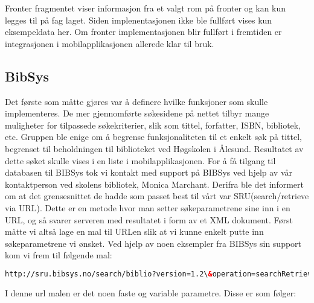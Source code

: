 \documentclass[../main.tex]{subfiles}
\begin{document}
Fronter fragmentet viser informasjon fra et valgt rom på fronter og kan kun legges til på fag laget. Siden implenentasjonen ikke ble fullført vises kun eksempeldata her. Om fronter implementasjonen blir fullført i fremtiden er integrasjonen i mobilapplikasjonen allerede klar til bruk. 

\subsection{BibSys}

Det første som måtte gjøres var å definere hvilke funksjoner som skulle implementeres. De mer gjennomførte søkesidene på nettet tilbyr mange muligheter for tilpassede søkekriterier, slik som tittel, forfatter, ISBN, bibliotek, etc.  Gruppen ble enige om å begrense funksjonaliteten til et enkelt søk på tittel, begrenset til beholdningen til biblioteket ved Høgskolen i Ålesund. Resultatet av dette søket skulle vises i en liste i mobilapplikasjonen.\newline
\newline
For å få tilgang til databasen til BIBSys tok vi kontakt med support på BIBSys ved hjelp av vår kontaktperson ved skolens bibliotek, Monica Marchant. Derifra ble det informert om at det grensesnittet de hadde som passet best til vårt var SRU(search/retrieve via URL). Dette er en metode hvor man setter søkeparametrene sine inn i en URL, og så svarer serveren med resultatet i form av et XML dokument.
\newline
Først måtte vi altså lage en mal til URLen slik at vi kunne enkelt putte inn søkeparametrene vi ønsket. Ved hjelp av noen eksempler fra BIBSys sin support kom vi frem til følgende mal:
\newline
\begin{lstlisting}[language=HTML, frame=single]
http://sru.bibsys.no/search/biblio?version=1.2\&operation=searchRetrieve\&startRecord=1\&maximumRecords=10\&query=bs.bibkode=xb\%20AND\%20bs.tittel=ibsen
\end{lstlisting}
I denne url malen er det noen faste og variable parametre. Disse er som følger:
\end{document}
